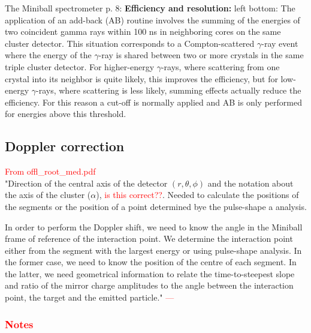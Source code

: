 \documentclass[twoside,english]{uiofysmaster/uiofysmaster}
\newcommand{\ga}{$\gamma$}
\begin{document}
The Miniball spectrometer \cite{MB-spect} \newline
p. 8: \newline
\textbf{Efficiency and resolution:}
left bottom: \newline
The application of an add-back (AB) routine involves the summing of the energies of two coincident gamma rays within 100 ns in neighboring cores on the same cluster detector. This situation corresponds to a Compton-scattered \ga-ray event where the energy of the \ga-ray is shared between two or more crystals in the same triple cluster detector. For higher-energy \ga-rays, where scattering from one crystal into its neighbor is quite likely, this improves the efficiency, but for low-energy \ga-rays, where scattering is less likely, summing effects actually reduce the efficiency. For this reason a cut-off is normally applied and AB is only performed for energies above this threshold. \newline


\subsection{Doppler correction}


\textcolor{red}{From offl\_root\_med.pdf} \\
"Direction of the central axis of the detector $(r, \theta, \phi)$ and the notation about the axis of the cluster ($\alpha$), \textcolor{red}{is this correct??}. Needed to calculate the positions of the segments or the position of a point determined bye the pulse-shape a analysis.

In order to perform the Doppler shift, we need to know the angle in the Miniball frame of reference of the interaction point. We determine the interaction point either from the segment with the largest energy or using pulse-shape analysis. In the former case, we need to know the position of the centre of each segment. In the latter, we need geometrical information to relate the time-to-steepest slope and ratio of the mirror charge amplitudes to the angle between the interaction point, the target and the emitted particle." \newline
\textcolor{red}{---}









\subsubsection*{\textcolor{red}{Notes}}
\end{document}
